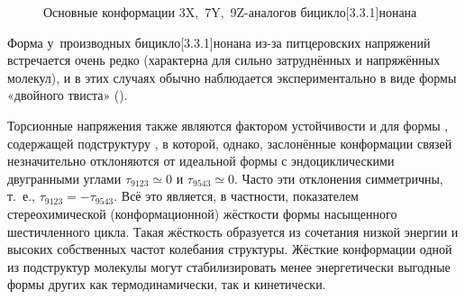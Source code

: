 \begin{figure}
\vspace{\medskipamount}
\caption{\label{fig:System331:379XYZ:Conf}Основные конформации 3X,~7Y,~9Z-аналогов бицикло[3.3.1]нонана}
\end{figure}

Форма \BB{} у~производных бицикло[3.3.1]нонана из-за питцеровских напряжений встречается очень редко (характерна для сильно затруднённых и напряжённых молекул), и в этих случаях обычно наблюдается экспериментально в виде формы «двойного твиста» (\TT{}).

Торсионные напряжения также являются фактором устойчивости и для формы \CB{}, содержащей подструктуру , в которой, однако, заслонённые конформации связей незначительно отклоняются от идеальной формы  с эндоциклическими двугранными углами $\tau_{9123}\simeq 0$ и $\tau_{9543}\simeq 0$. Часто эти отклонения симметричны, т. е., $\tau_{9123} = - \tau_{9543}$. Всё это является, в частности, показателем стереохимической (конформационной) жёсткости формы  насыщенного шестичленного цикла. Такая жёсткость образуется из сочетания низкой энергии и высоких собственных частот колебания структуры. Жёсткие конформации одной из подструктур молекулы могут стабилизировать менее энергетически выгодные формы других как термодинамически, так и кинетически.

